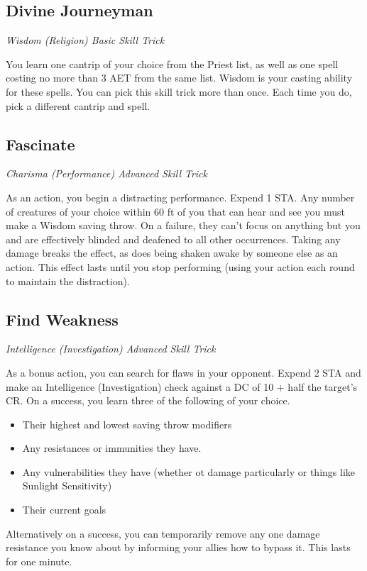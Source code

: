 \subsection{Divine Journeyman}

\textit{Wisdom (Religion) Basic Skill Trick}

You learn one cantrip of your choice from the Priest list, as well as one spell costing no more than 3 AET from the same list. Wisdom is your casting ability for these spells. You can pick this skill trick more than once. Each time you do, pick a different cantrip and spell.

\subsection{Fascinate}

\textit{Charisma (Performance) Advanced Skill Trick}

As an action, you begin a distracting performance. Expend 1 STA. Any number of creatures of your choice within 60 ft of you that can hear and see you must make a Wisdom saving throw. On a failure, they can't focus on anything but you and are effectively blinded and deafened to all other occurrences. Taking any damage breaks the effect, as does being shaken awake by someone else as an action. This effect lasts until you stop performing (using your action each round to maintain the distraction).

\subsection{Find Weakness}

\textit{Intelligence (Investigation) Advanced Skill Trick}

As a bonus action, you can search for flaws in your opponent. Expend 2 STA and make an Intelligence (Investigation) check against a DC of 10 + half the target's CR. On a success, you learn three of the following of your choice.
\begin{itemize}
	\item Their highest and lowest saving throw modifiers
	\item Any resistances or immunities they have.
	\item Any vulnerabilities they have (whether ot damage particularly or things like Sunlight Sensitivity)
	\item Their current goals
\end{itemize}

Alternatively on a success, you can temporarily remove any one damage resistance you know about by informing your allies how to bypass it. This lasts for one minute.

